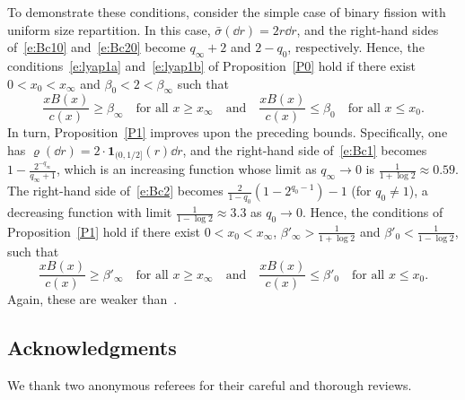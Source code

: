To demonstrate these conditions, consider the simple case of binary fission with uniform size repartition. In this case, $\bar \sigma(\dd r) = 2r \dd r $, and the right-hand sides of~\eqref{e:Bc10} and~\eqref{e:Bc20} become $q_{\infty}+2$ and $2-q_0$, respectively. Hence, the conditions~\eqref{e:lyap1a} and~\eqref{e:lyap1b} of Proposition~\ref{P0} hold if there exist $0<x_0<x_{\infty}$ and $\beta_0<2<\beta_{\infty}$ such that
\[
\frac{x B(x)}{c(x)} \geq \beta_{\infty} \quad \text{for all } x \ge x_\infty
\quad \text{and} \quad
\frac{x B(x)}{c(x)} \leq \beta_0 \quad \text{for all }x \le x_0.
\]
In turn, Proposition~\ref{P1} improves upon the preceding bounds. Specifically, one has $\varrho(\dd r) = 2\cdot {\mathbf 1}_{(0,1/2]}(r) \dd r$, and the right-hand side of~\eqref{e:Bc1} becomes $1-\frac{2^{-q_\infty}}{q_\infty+1}$, which is an increasing function whose limit as $q_\infty\to 0$ is $\frac{1}{1+\log 2} \approx 0.59$. The right-hand side of~\eqref{e:Bc2} becomes $\frac{2}{1-q_0}(1-2^{q_0-1})-1$ (for $q_0\ne 1$), a decreasing function with limit $\frac{1}{1-\log 2} \approx 3.3$ as $q_0\to 0$. Hence, the conditions of Proposition~\ref{P1} hold if there exist $0<x_0<x_{\infty}$, $\beta'_{\infty}>\frac{1}{1+\log 2}$ and $\beta'_0<\frac{1}{1-\log 2}$, such that
\[
\frac{x B(x)}{c(x)} \geq \beta'_{\infty} \quad \text{for all } x \ge x_\infty
\quad \text{and} \quad
\frac{x B(x)}{c(x)} \leq \beta'_0 \quad \text{for all }x \le x_0.
\]
Again, these are weaker than~\cite[Conditions (12) and (13)]{DoumGab}.

\subsection*{Acknowledgments}
We thank two anonymous referees for their careful and thorough reviews.


